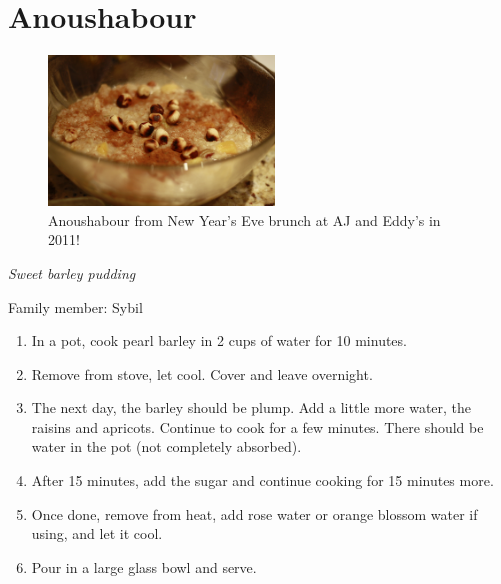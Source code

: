 \chapter{Anoushabour}
\label{ch:anoushabour}


\begin{figure}
  \includegraphics[width=60mm]{dermardiros/images/Anoushabour.JPG}
    \caption{Anoushabour from New Year's Eve brunch at AJ and Eddy's in 2011!}
\end{figure}

\textit{Sweet barley pudding}

Family member: Sybil

\begin{enumerate}
    \item In a pot, cook pearl barley in 2 cups of water for 10 minutes.
    \item Remove from stove, let cool. Cover and leave overnight.
    \item The next day, the barley should be plump. Add a little more water, the raisins and apricots. Continue to cook for a few minutes. There should be water in the pot (not completely absorbed).
    \item After 15 minutes, add the sugar and continue cooking for 15 minutes more.
    \item Once done, remove from heat, add rose water or orange blossom water if using, and let it cool.
    \item Pour in a large glass bowl and serve.
\end{enumerate}
